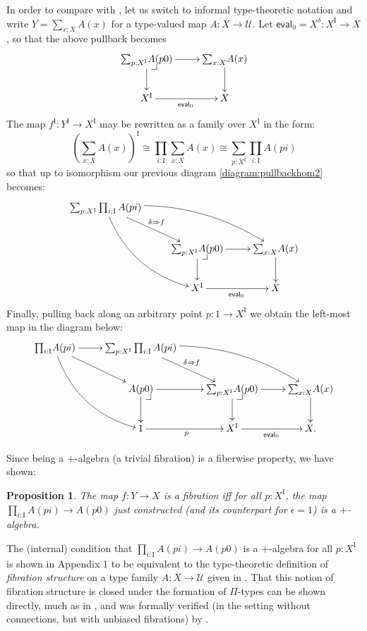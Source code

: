 \documentclass[12pt]{article}
\makeatletter
\newcommand{\pbcorner}[1][dr]{\save*!/#1-1.2pc/#1:(-1,1)@^{|-}\restore}
\newcommand{\ra}{\ensuremath{\rightarrow}}
\newcommand{\I}{\ensuremath{\mathrm{I}}}
\newcommand{\U}{\ensuremath{\mathcal{U}}}
\newtheorem{proposition}[theorem]{Proposition}
\theoremstyle{remark}
\theoremstyle{definition}
\makeatother
\begin{document}
In order to compare with \cite{OP}, let us switch to informal type-theoretic notation and write $Y=\sum_{x:X}A(x)$ for a type-valued map $A : X\ra \U$.  Let $\mathsf{eval}_0 = X^\delta : X^\I\ra X$, so that the above pullback becomes
\begin{equation*}\label{diagram:pullbackhom3}
\xymatrix{
 {\sum_{p:X^\I}}A(p0) \ar[d] \ar[r] \pbcorner & {\sum_{x:X}}A(x) \ar[d] \\
 X^\I \ar[r]_{\mathsf{eval}_0} &  X
}
\end{equation*}
The map $f^\I:Y^\I\ra X^\I$ may be rewritten as a family over $X^\I$ in the form:
\[
(\sum_{x:X}A(x))^\I \cong \prod_{i:\I}\sum_{x:X}A(x) \cong \sum_{p:X^\I}\prod_{i:\I}A(pi)
\]
so that up to isomorphism our previous diagram \eqref{diagram:pullbackhom2} becomes:
\begin{equation*}\label{diagram:pullbackhom3}
\xymatrix{
{\sum_{p:X^\I}}\prod_{i:\I}A(pi) \ar@/_4ex/ [rdd] \ar[rd]^{\delta\Rightarrow{f}} \ar@/^4ex/ [rrd] && \\
& {\sum_{p:X^\I}}A(p0) \ar[d] \ar[r] \pbcorner & {\sum_{x:X}}A(x) \ar[d] \\
& X^\I \ar[r]_{\mathsf{eval}_0} &  X
}
\end{equation*}
Finally, pulling back along an arbitrary point $p : 1\ra X^\I$ we obtain the left-most map in the diagram below:
\begin{equation*}\label{diagram:pullbackhom3}
\xymatrix{
{\prod_{i:\I}}A(pi) \ar@/_4ex/ [rdd] \ar[rd] \ar[r] 
	& {\sum_{p:X^\I}}\prod_{i:\I}A(pi)  \ar[rd]^{\delta\Rightarrow{f}} \ar@/^4ex/ [rrd] && \\
& A(p0) \ar[d] \ar[r] \pbcorner & {\sum_{p:X^\I}}A(p0) \ar[d] \ar[r] \pbcorner & {\sum_{x:X}}A(x) \ar[d] \\
& 1 \ar[r]_{p} & X^\I \ar[r]_{\mathsf{eval}_0} &  X.
}
\end{equation*}

Since being a $+$-algebra (a trivial fibration) is a fiberwise property, we have shown:
\begin{proposition}
The map $f : Y\ra X$ is a fibration iff for all $p: X^\I$, the map ${\prod_{i:\I}}A(pi) \ra A(p0)$ just constructed (and its counterpart for $\epsilon = 1$) is a $+$-algebra.
\end{proposition}

The (internal) condition that ${\prod_{i:\I}}A(pi) \ra A(p0)$ is a $+$-algebra for all $p: X^\I$ is shown in Appendix 1 to be equivalent to the type-theoretic definition of \emph{fibration structure} on a type family $A: X\ra \U$ given in \cite{OP}.  That this notion of fibration structure is closed under the formation of $\Pi$-types can be shown directly, much as in \cite{OP}, and was formally verified (in the setting without connections, but with unbiased fibrations) by \cite{Zesen}.
\end{document}
